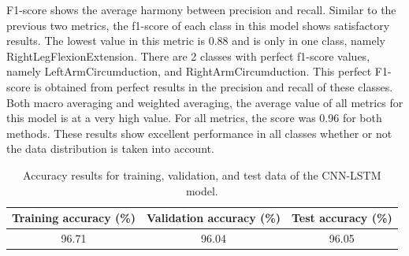 F1-score shows the average harmony between precision and recall. Similar to the previous two metrics, the f1-score of each class in this model shows satisfactory results. The lowest value in this metric is 0.88 and is only in one class, namely RightLegFlexionExtension. There are 2 classes with perfect f1-score values, namely LeftArmCircumduction, and RightArmCircumduction. This perfect F1-score is obtained from perfect results in the precision and recall of these classes. Both macro averaging and weighted averaging, the average value of all metrics for this model is at a very high value. For all metrics, the score was 0.96 for both methods. These results show excellent performance in all classes whether or not the data distribution is taken into account.

\begin{table}[h!]
	\caption{Accuracy results for training, validation, and test data of the CNN-LSTM model.}
	\label{tab:CNNLSTMAccuracy}
	\centering
	\begin{tabular}{|c|c|c|}
		\hline
		Training accuracy (\%) & Validation accuracy (\%) & Test accuracy (\%) \\ \hline
		96.71                  & 96.04                    & 96.05              \\ \hline
	\end{tabular}
\end{table}


